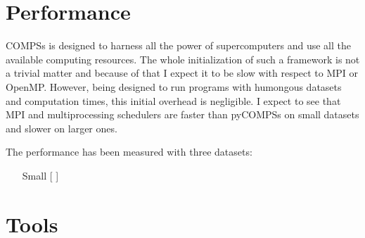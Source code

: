 \section{Performance}

\label{sec:resperformance}

COMPSs is designed to harness all the power of supercomputers and use all the available computing resources. The whole initialization of such a framework is not a trivial matter and because of that I expect it to be slow with respect to MPI or OpenMP. However, being designed to run programs with humongous datasets and computation times, this initial overhead is negligible. I expect to see that MPI and multiprocessing schedulers are faster than pyCOMPSs on small datasets and slower on larger ones. 

The performance has been measured with three datasets:

\begin{itemize}
\item [Small []]
\end{itemize}


\section{Tools}